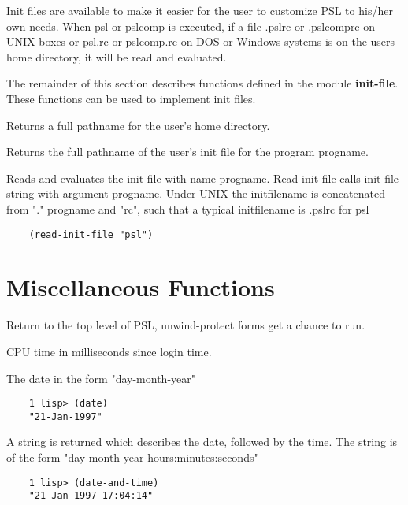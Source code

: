 Init files are available to make it easier for the user to
customize PSL to his/her own needs.  When psl or pslcomp
is  executed, if a file .pslrc or .pslcomprc on UNIX boxes
or psl.rc or pslcomp.rc on DOS or Windows systems
is on the users home directory, it will be read and evaluated.

The remainder of this section describes functions defined in
the module {\bf init-file}. These functions can be used to implement
init files. 

{    Returns a full pathname for the user's home directory.
}

{    Returns  the  full  pathname of the user's init file for the
    program progname.
}

{   
    Reads and evaluates the init  file  with  name  progname.
    Read-init-file  calls  init-file-string   with   argument
    progname. Under UNIX the initfilename is concatenated from
    "." progname and "rc", such that a typical initfilename is
    .pslrc for psl
}
\begin{verbatim}
    (read-init-file "psl")
\end{verbatim}

\section{Miscellaneous Functions}


{    Return to the top level of PSL, unwind-protect forms  get  a
    chance to run.  }

{    CPU time in milliseconds since login time.  }

{    The date in the form "day-month-year" }
\begin{verbatim}
    1 lisp> (date)
    "21-Jan-1997"
\end{verbatim}

{   
     A  string  is returned which describes the date, followed by
    the time.  The string is of the form
}
    "day-month-year hours:minutes:seconds"

\begin{verbatim}
    1 lisp> (date-and-time)
    "21-Jan-1997 17:04:14"
\end{verbatim}
